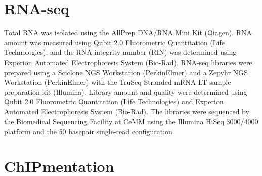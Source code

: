 \documentclass[10pt,]{article}
\begin{document}
\section{RNA-seq}\label{rna-seq}

Total RNA was isolated using the AllPrep DNA/RNA Mini Kit (Qiagen). RNA
amount was measured using Qubit 2.0 Fluorometric Quantitation (Life
Technologies), and the RNA integrity number (RIN) was determined using
Experion Automated Electrophoresis System (Bio-Rad). RNA-seq libraries
were prepared using a Sciclone NGS Workstation (PerkinElmer) and a
Zepyhr NGS Workstation (PerkinElmer) with the TruSeq Stranded mRNA LT
sample preparation kit (Illumina). Library amount and quality were
determined using Qubit 2.0 Fluorometric Quantitation (Life Technologies)
and Experion Automated Electrophoresis System (Bio-Rad). The libraries
were sequenced by the Biomedical Sequencing Facility at CeMM using the
Illumina HiSeq 3000/4000 platform and the 50 basepair single-read
configuration.

\section{ChIPmentation}\label{chipmentation}
\end{document}
